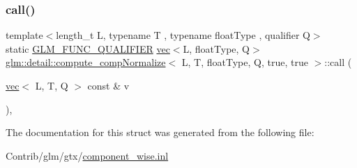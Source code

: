\subsubsection{\texorpdfstring{call()}{call()}}
{\footnotesize\ttfamily template$<$length\+\_\+t L, typename T , typename float\+Type , qualifier Q$>$ \\
static \mbox{\hyperlink{setup_8hpp_a33fdea6f91c5f834105f7415e2a64407}{G\+L\+M\+\_\+\+F\+U\+N\+C\+\_\+\+Q\+U\+A\+L\+I\+F\+I\+ER}} \mbox{\hyperlink{structglm_1_1vec}{vec}}$<$L, float\+Type, Q$>$ \mbox{\hyperlink{structglm_1_1detail_1_1compute__comp_normalize}{glm\+::detail\+::compute\+\_\+comp\+Normalize}}$<$ L, T, float\+Type, Q, true, true $>$\+::call (\begin{DoxyParamCaption}\item[{\mbox{\hyperlink{structglm_1_1vec}{vec}}$<$ L, T, Q $>$ const \&}]{v }\end{DoxyParamCaption})\hspace{0.3cm}{\ttfamily [inline]}, {\ttfamily [static]}}



The documentation for this struct was generated from the following file\+:\begin{DoxyCompactItemize}
\item 
Contrib/glm/gtx/\mbox{\hyperlink{component__wise_8inl}{component\+\_\+wise.\+inl}}\end{DoxyCompactItemize}
